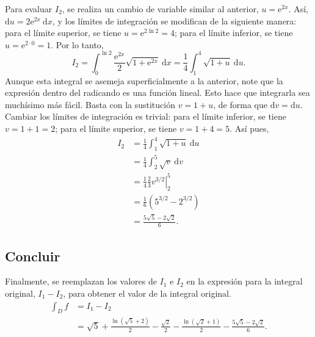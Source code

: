 \documentclass{fmbvecto}
\begin{document}
\begin{problema}
    Para evaluar \(I_2\), se realiza un cambio de variable similar al anterior, \(u = \mathrm{e}^{2x}\). Así, \(\mathrm{d}u = 2 \mathrm{e}^{2x} \: \mathrm{d}x\), y los límites de integración se modifican de la siguiente manera: para el límite superior, se tiene \(u = \mathrm{e}^{2 \ln 2} = 4\); para el límite inferior, se tiene \(u = \mathrm{e}^{2 \cdot 0} = 1\). Por lo tanto,
    \[ I_2 = \int_{0}^{\ln 2} \frac{\mathrm{e}^{2x}}{2} \sqrt{1 + \mathrm{e}^{2x}} \: \mathrm{d}x = \frac{1}{4} \int_{1}^{4} \sqrt{1 + u} \: \mathrm{d}u. \]
    Aunque esta integral se asemeja superficialmente a la anterior, note que la expresión dentro del radicando es una función lineal. Esto hace que integrarla sea muchísimo más fácil. Basta con la sustitución \(v = 1 + u\), de forma que \(\mathrm{d}v = \mathrm{d}u\). Cambiar los límites de integración es trivial: para el límite inferior, se tiene \(v = 1 + 1 = 2\); para el límite superior, se tiene \(v = 1 + 4 = 5\). Así pues,
    \begin{align*}
        I_2 &= \frac{1}{4} \int_{1}^{4} \sqrt{1 + u} \: \mathrm{d}u \\
        &= \frac{1}{4} \int_{2}^{5} \sqrt{v} \: \mathrm{d}v \\
        &= \frac{1}{4} \left. \frac{2}{3} v^{3/2} \right\vert_{2}^{5} \\
        &= \frac{1}{6} \left( 5^{3/2} - 2^{3/2} \right) \\
        &= \frac{5 \sqrt{5} - 2 \sqrt{2}}{6}.
    \end{align*}

    \subsection{Concluir}

    Finalmente, se reemplazan los valores de \(I_1\) e \(I_2\) en la expresión para la integral original, \(I_1 - I_2\), para obtener el valor de la integral original.
    \begin{align*}
        \int_D f &= I_1 - I_2 \\
        &= \sqrt{5} + \frac{\ln(\sqrt{5} + 2)}{2}  - \frac{\sqrt{2}}{2}  - \frac{\ln(\sqrt{2} + 1)}{2} - \frac{5 \sqrt{5} - 2 \sqrt{2}}{6}.
    \end{align*}
\end{problema}
\end{document}
